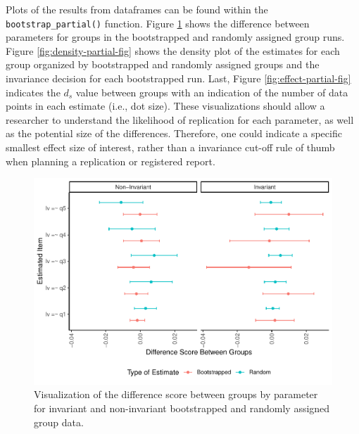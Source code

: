 \documentclass[
  man]{apa7}
\begin{document}
Plots of the results from dataframes can be found within the \texttt{bootstrap\_partial()} function. Figure \ref{fig:invariance-partial-fig} shows the difference between parameters for groups in the bootstrapped and randomly assigned group runs. Figure \ref{fig:density-partial-fig} shows the density plot of the estimates for each group organized by bootstrapped and randomly assigned groups and the invariance decision for each bootstrapped run. Last, Figure \ref{fig:effect-partial-fig} indicates the \(d_s\) value between groups with an indication of the number of data points in each estimate (i.e., dot size). These visualizations should allow a researcher to understand the likelihood of replication for each parameter, as well as the potential size of the differences. Therefore, one could indicate a specific smallest effect size of interest, rather than a invariance cut-off rule of thumb when planning a replication or registered report.

\begin{figure}
\centering
\includegraphics{manuscript_files/figure-latex/invariance-partial-fig-1.pdf}
\caption{\label{fig:invariance-partial-fig}Visualization of the difference score between groups by parameter for invariant and non-invariant bootstrapped and randomly assigned group data.}
\end{figure}
\end{document}
